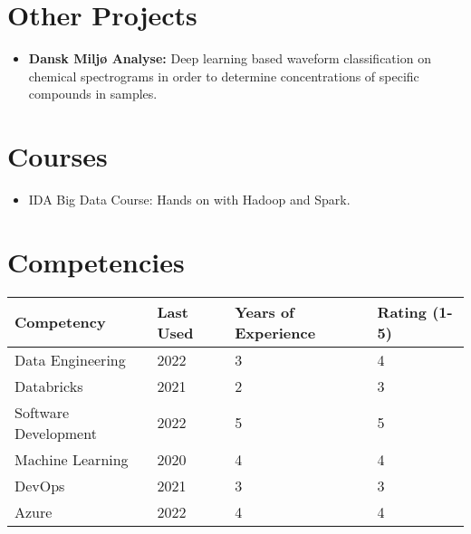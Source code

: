 \documentclass[letterpaper]{twentysecondcv} %
\begin{document}
\section{Other Projects}
{
    \begin{itemize}
        \item \textbf{Dansk Miljø Analyse:} Deep learning based waveform classification on chemical spectrograms in order to determine concentrations of specific compounds in samples.
    \end{itemize}}

\section{Courses}
{
    \begin{itemize}
        \item IDA Big Data Course: Hands on with Hadoop and Spark.
    \end{itemize}}

    \section{Competencies}

    \begin{table}[h]
        \centering
        \begin{tabular}{|l|l|l|l|}
        \hline
        \textbf{Competency} & \textbf{Last Used} & \textbf{Years of Experience} & \textbf{Rating (1-5)} \\
        \hline
        Data Engineering & 2022 & 3 & 4 \\
        \hline
        Databricks & 2021 & 2 & 3 \\
        \hline
        Software Development & 2022 & 5 & 5 \\
        \hline
        Machine Learning & 2020 & 4 & 4 \\
        \hline
        DevOps & 2021 & 3 & 3 \\
        \hline
        Azure & 2022 & 4 & 4 \\
        \hline
        \end{tabular}
    \end{table}
\end{document}
